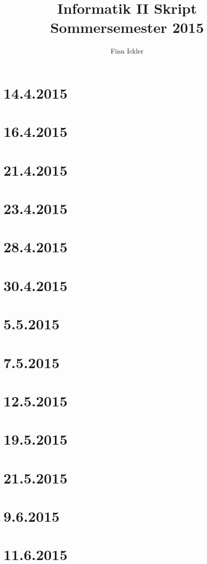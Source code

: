 \documentclass[a4paper,12pt,twoside]{article}
\author{Finn Ickler}
\title{Informatik II Skript Sommersemester 2015}
\begin{document}
	\graphicspath{{./Graphics/}}
\renewcommand{\underline}[1]{\emph{#1}}
\renewcommand{\uline}[1]{\emph{#1}}
\maketitle
\tableofcontents
\lstlistoflistings
\newpage
\section{14.4.2015}

\section{16.4.2015}

\section{21.4.2015}

\section{23.4.2015}

\section{28.4.2015}

\section{30.4.2015}

\section{5.5.2015}

\section{7.5.2015}

\pagebreak
\section{12.5.2015}

\section{19.5.2015}

\section{21.5.2015}

\section{9.6.2015}

\section{11.6.2015}

\end{document}
